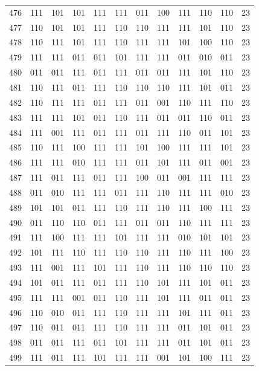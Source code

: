 \begin{longtable}{r*{10}{c}r}
476 & 111 & 101 & 101 & 111 & 111 & 011 & 100 & 111 & 110 & 110 & 23\\
477 & 110 & 101 & 101 & 111 & 110 & 110 & 111 & 111 & 101 & 110 & 23\\
478 & 110 & 111 & 101 & 111 & 110 & 111 & 111 & 101 & 100 & 110 & 23\\
479 & 111 & 111 & 011 & 011 & 101 & 111 & 111 & 011 & 010 & 011 & 23\\
480 & 011 & 011 & 111 & 011 & 111 & 011 & 011 & 111 & 101 & 110 & 23\\
481 & 110 & 111 & 011 & 111 & 110 & 110 & 110 & 111 & 101 & 011 & 23\\
482 & 110 & 111 & 111 & 011 & 111 & 011 & 001 & 110 & 111 & 110 & 23\\
483 & 111 & 111 & 101 & 011 & 110 & 111 & 011 & 011 & 110 & 011 & 23\\
484 & 111 & 001 & 111 & 011 & 111 & 011 & 111 & 110 & 011 & 101 & 23\\
485 & 110 & 111 & 100 & 111 & 111 & 101 & 100 & 111 & 111 & 101 & 23\\
486 & 111 & 111 & 010 & 111 & 111 & 011 & 101 & 111 & 011 & 001 & 23\\
487 & 111 & 011 & 111 & 011 & 111 & 100 & 011 & 001 & 111 & 111 & 23\\
488 & 011 & 010 & 111 & 111 & 011 & 111 & 110 & 111 & 111 & 010 & 23\\
489 & 101 & 101 & 011 & 111 & 110 & 111 & 110 & 111 & 100 & 111 & 23\\
490 & 011 & 110 & 110 & 011 & 111 & 011 & 011 & 110 & 111 & 111 & 23\\
491 & 111 & 100 & 111 & 111 & 101 & 111 & 111 & 010 & 101 & 101 & 23\\
492 & 101 & 111 & 110 & 111 & 110 & 110 & 111 & 110 & 111 & 100 & 23\\
493 & 111 & 001 & 111 & 101 & 111 & 110 & 111 & 110 & 110 & 110 & 23\\
494 & 101 & 011 & 111 & 011 & 111 & 110 & 101 & 111 & 101 & 011 & 23\\
495 & 111 & 111 & 001 & 011 & 110 & 111 & 101 & 111 & 011 & 011 & 23\\
496 & 110 & 010 & 011 & 111 & 110 & 111 & 111 & 101 & 111 & 011 & 23\\
497 & 110 & 011 & 011 & 111 & 110 & 111 & 111 & 011 & 101 & 011 & 23\\
498 & 011 & 011 & 111 & 011 & 101 & 111 & 111 & 011 & 101 & 011 & 23\\
499 & 111 & 011 & 111 & 101 & 111 & 111 & 001 & 101 & 100 & 111 & 23\\

\end{longtable}
